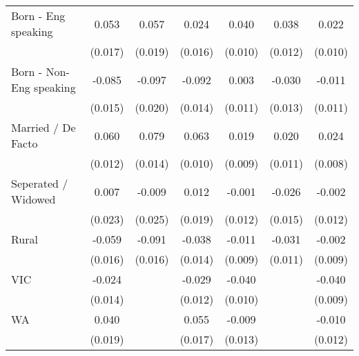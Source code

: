 {\begin{tabular}{l*{6}{c}}
Born - Eng speaking &       0.053\sym{***}&       0.057\sym{***}&       0.024         &       0.040\sym{***}&       0.038\sym{***}&       0.022\sym{**} \\
                    &     (0.017)         &     (0.019)         &     (0.016)         &     (0.010)         &     (0.012)         &     (0.010)         \\
Born - Non-Eng speaking&      -0.085\sym{***}&      -0.097\sym{***}&      -0.092\sym{***}&       0.003         &      -0.030\sym{**} &      -0.011         \\
                    &     (0.015)         &     (0.020)         &     (0.014)         &     (0.011)         &     (0.013)         &     (0.011)         \\
Married / De Facto  &       0.060\sym{***}&       0.079\sym{***}&       0.063\sym{***}&       0.019\sym{**} &       0.020\sym{*}  &       0.024\sym{***}\\
                    &     (0.012)         &     (0.014)         &     (0.010)         &     (0.009)         &     (0.011)         &     (0.008)         \\
Seperated / Widowed &       0.007         &      -0.009         &       0.012         &      -0.001         &      -0.026\sym{*}  &      -0.002         \\
                    &     (0.023)         &     (0.025)         &     (0.019)         &     (0.012)         &     (0.015)         &     (0.012)         \\
Rural               &      -0.059\sym{***}&      -0.091\sym{***}&      -0.038\sym{***}&      -0.011         &      -0.031\sym{***}&      -0.002         \\
                    &     (0.016)         &     (0.016)         &     (0.014)         &     (0.009)         &     (0.011)         &     (0.009)         \\
VIC                 &      -0.024\sym{*}  &                     &      -0.029\sym{**} &      -0.040\sym{***}&                     &      -0.040\sym{***}\\
                    &     (0.014)         &                     &     (0.012)         &     (0.010)         &                     &     (0.009)         \\
WA                  &       0.040\sym{**} &                     &       0.055\sym{***}&      -0.009         &                     &      -0.010         \\
                    &     (0.019)         &                     &     (0.017)         &     (0.013)         &                     &     (0.012)         \\

\end{tabular}}

